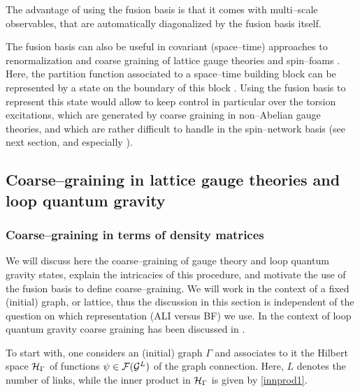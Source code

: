 \documentclass[nofootinbib,superscriptaddress,eqsecnum,tightenlines,11pt]{revtex4-1}
\begin{document}
 The advantage of using the fusion basis is that it comes with multi--scale observables, that are automatically diagonalized by the fusion basis itself.

The fusion basis can also be useful in  covariant (space--time) approaches to renormalization and coarse graining of lattice gauge theories and spin--foams \cite{FiniteSF, Clement,BS}. 
Here, the partition function associated to a space--time building block can be represented by a state on the boundary of this block \cite{Ditt12b,DittStein13,DecTNW}. 
Using the fusion basis to represent this state would allow to keep control in particular over the torsion excitations, which are generated by coarse graining in non--Abelian gauge theories, and which are rather difficult to handle in the spin--network basis (see next section, and especially \cite{Clement}). 






\subsection{Coarse--graining in lattice gauge theories and loop quantum gravity}


\subsubsection{Coarse--graining in terms of density matrices}\label{densitym}

We will discuss here the coarse--graining of gauge theory and loop quantum gravity states, explain the intricacies of this procedure, and motivate the use of the fusion basis to define coarse--graining. 
We will work in the context of a fixed (initial)  graph, or lattice, thus the discussion in this section is independent of the question on which representation (ALI versus BF) we use. 
In the context of loop quantum gravity coarse graining has been discussed in \cite{RovelliQuanta, EteraCG, EteraTags, DG14b,BDG15}. 

To start with, one considers an (initial) graph $\Gamma$ and associates to it the Hilbert space ${\cal H}_\Gamma$ of functions $\psi \in {\cal F}({\cal G}^L)$ of the graph connection. 
Here, $L$ denotes the number of links, while the inner product in ${\cal H}_\Gamma$ is given by \eqref{innprod1}.
\end{document}
